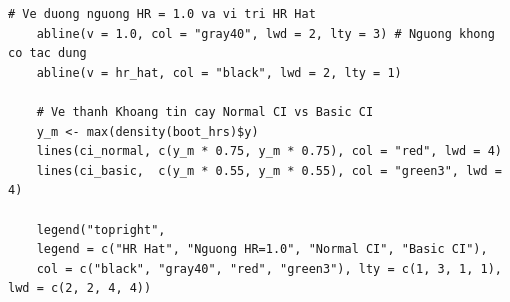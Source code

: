 \begin{lstlisting}[style=Rstyle, caption={Bootstrap HR}]
	# Ve duong nguong HR = 1.0 va vi tri HR Hat
	abline(v = 1.0, col = "gray40", lwd = 2, lty = 3) # Nguong khong co tac dung
	abline(v = hr_hat, col = "black", lwd = 2, lty = 1)
	
	# Ve thanh Khoang tin cay Normal CI vs Basic CI
	y_m <- max(density(boot_hrs)$y)
	lines(ci_normal, c(y_m * 0.75, y_m * 0.75), col = "red", lwd = 4)
	lines(ci_basic,  c(y_m * 0.55, y_m * 0.55), col = "green3", lwd = 4)
	
	legend("topright", 
	legend = c("HR Hat", "Nguong HR=1.0", "Normal CI", "Basic CI"),
	col = c("black", "gray40", "red", "green3"), lty = c(1, 3, 1, 1), lwd = c(2, 2, 4, 4))
\end{lstlisting}

